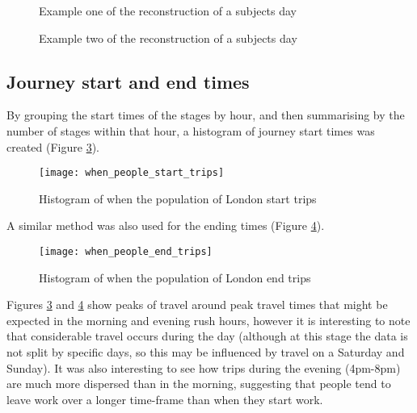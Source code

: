 \begin{landscape}

\begin{figure}[H]
\centering
{}
\caption{Example one of the reconstruction of a subjects day}
\label{fig:routed_results_example}
\end{figure}

\newpage

\begin{figure}[H]
\centering
{}
\caption{Example two of the reconstruction of a subjects day}
\label{fig:routed_results_example2}
\end{figure}

\end{landscape}

\subsection{Journey start and end times}
\label{sec:journey_start_and_end_times}

By grouping the start times of the stages by hour, and then summarising by the number of stages within that hour, a histogram of journey start times was created (Figure \ref{fig:when_people_start_trips}).

\begin{figure}[H]
\centering
\texttt{[image: when\_people\_start\_trips]}
\caption{Histogram of when the population of London start trips}
\label{fig:when_people_start_trips}
\end{figure}

A similar method was also used for the ending times (Figure \ref{fig:when_people_end_trips}).

\begin{figure}[H]
\centering
\texttt{[image: when\_people\_end\_trips]}
\caption{Histogram of when the population of London end trips}
\label{fig:when_people_end_trips}
\end{figure}

Figures \ref{fig:when_people_start_trips} and \ref{fig:when_people_end_trips} show peaks of travel around peak travel times that might be expected in the morning and evening rush hours, however it is interesting to note that considerable travel occurs during the day (although at this stage the data is not split by specific days, so this may be influenced by travel on a Saturday and Sunday). It was also interesting to see how trips during the evening (4pm-8pm) are much more dispersed than in the morning, suggesting that people tend to leave work over a longer time-frame than when they start work. 

